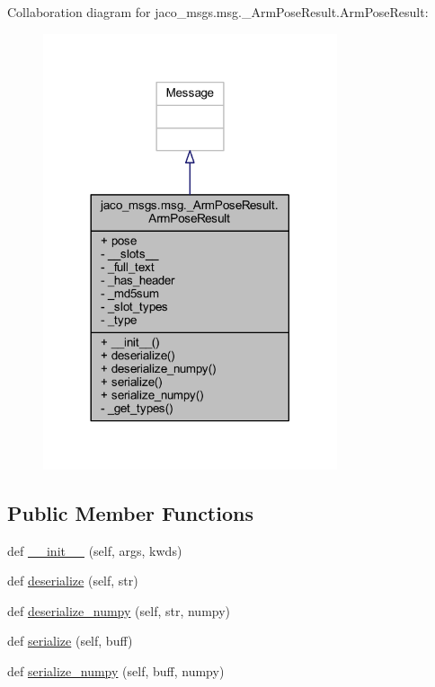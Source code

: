 Collaboration diagram for jaco\+\_\+msgs.\+msg.\+\_\+\+Arm\+Pose\+Result.\+Arm\+Pose\+Result\+:
\nopagebreak
\begin{figure}[H]
\begin{center}
\leavevmode
\includegraphics[width=245pt]{d0/dfa/classjaco__msgs_1_1msg_1_1__ArmPoseResult_1_1ArmPoseResult__coll__graph}
\end{center}
\end{figure}
\subsection*{Public Member Functions}
\begin{DoxyCompactItemize}
\item 
def \hyperlink{classjaco__msgs_1_1msg_1_1__ArmPoseResult_1_1ArmPoseResult_a34d4a7fadb6c745f213afc32de2732de}{\+\_\+\+\_\+init\+\_\+\+\_\+} (self, args, kwds)
\item 
def \hyperlink{classjaco__msgs_1_1msg_1_1__ArmPoseResult_1_1ArmPoseResult_a790fee86b6ab3f966b1429a12fea923a}{deserialize} (self, str)
\item 
def \hyperlink{classjaco__msgs_1_1msg_1_1__ArmPoseResult_1_1ArmPoseResult_a43b337fcc8432842fc41c375313c8ae4}{deserialize\+\_\+numpy} (self, str, numpy)
\item 
def \hyperlink{classjaco__msgs_1_1msg_1_1__ArmPoseResult_1_1ArmPoseResult_a10228688d2c0fb6adcd0704cd5d75206}{serialize} (self, buff)
\item 
def \hyperlink{classjaco__msgs_1_1msg_1_1__ArmPoseResult_1_1ArmPoseResult_ae14580df690e5c4ad0336be823e32b9d}{serialize\+\_\+numpy} (self, buff, numpy)
\end{DoxyCompactItemize}
